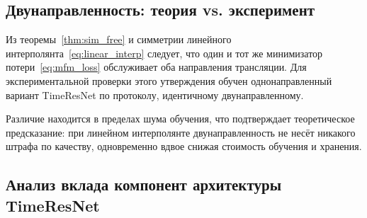 \subsection{Двунаправленность: теория vs. эксперимент}
\label{sec:unidirectional}

Из теоремы~\ref{thm:sim_free} и симметрии линейного интерполянта~\eqref{eq:linear_interp} следует, что один и тот же минимизатор потери~\eqref{eq:mfm_loss} обслуживает оба направления трансляции. Для экспериментальной проверки этого утверждения обучен однонаправленный вариант TimeResNet по протоколу, идентичному двунаправленному.

\begin{table}[htbp]
\centering
\caption{Двунаправленный MFM против однонаправленного TimeResNet (контрастное $\to$ нативное, held-out).}
\label{tab:unidirectional}
\end{table}

Различие находится в пределах шума обучения, что подтверждает теоретическое предсказание: при линейном интерполянте двунаправленность не несёт никакого штрафа по качеству, одновременно вдвое снижая стоимость обучения и хранения.

\subsection{Анализ вклада компонент архитектуры TimeResNet}
\label{sec:ablation}

\begin{table}[htbp]
\centering
\caption{Анализ вклада компонент TimeResNet (held-out, Эйлер 1 шаг, контрастное $\to$ нативное).}
\label{tab:ablation}
\end{table}

